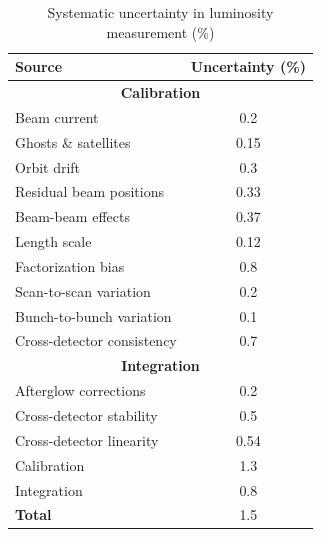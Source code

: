 \begin{table}[H]
  \centering
  \caption{Systematic uncertainty in luminosity measurement (\%)}
    \begin{tabular}{l|c}
        \textbf{Source} & \textbf{Uncertainty (\%)} \\
        \hline
        \multicolumn{2}{c}{\textbf{Calibration}} \\
        \hline
        Beam current & 0.2 \\
        Ghosts \& satellites & 0.15 \\
        Orbit drift & 0.3 \\
        Residual beam positions & 0.33 \\
        Beam-beam effects & 0.37 \\
        Length scale & 0.12 \\
        Factorization bias & 0.8 \\
        Scan-to-scan variation & 0.2 \\
        Bunch-to-bunch variation & 0.1 \\
        Cross-detector consistency & 0.7 \\
        \hline
        \multicolumn{2}{c}{\textbf{Integration}} \\
        \hline
        Afterglow corrections & 0.2 \\
        Cross-detector stability & 0.5 \\
        Cross-detector linearity & 0.54 \\
        \hline
        Calibration & 1.3 \\
        Integration & 0.8 \\
        \hline
        \textbf{Total} & 1.5 \\
    \end{tabular}
    \label{table:correction_uncertainties}
\end{table}


